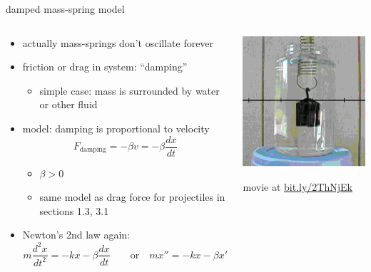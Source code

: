 \documentclass[urlcolor=blue]{beamer}
\begin{document}
\begin{frame}{damped mass-spring model}

\begin{columns}
\begin{column}{0.7\textwidth}
\begin{itemize}
\small
\item actually mass-springs don't oscillate forever
\item friction or drag in system: ``damping''
    \begin{itemize}
    \item simple case: mass is surrounded by water or other fluid
    \end{itemize}
\item model: damping is proportional to velocity
$$F_{\text{damping}} = - \beta v = - \beta \frac{dx}{dt}$$

\vspace{-2mm}
    \begin{itemize}
    \item $\beta > 0$
    \item same model as drag force for projectiles in sections 1.3, 3.1
    \end{itemize}
\item Newton's 2nd law again:
    $$\boxed{m \frac{d^2x}{dt^2} = - k x - \beta \frac{dx}{dt}} \qquad \text{or} \quad m x'' = -kx -\beta x'$$
\end{itemize}
\end{column}
\begin{column}{0.3\textwidth}
\includegraphics[width=1.1\textwidth]{figs/dampedmassspring}

\scriptsize movie at \href{https://bit.ly/2ThNjEk}{bit.ly/2ThNjEk}
\end{column}
\end{columns}
\end{frame}
\end{document}
